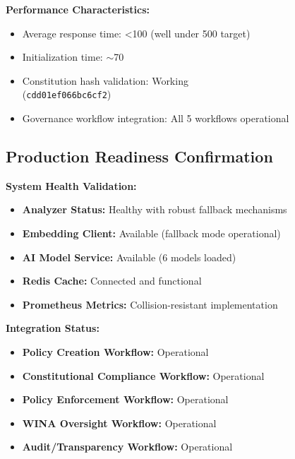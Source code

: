 \textbf{Performance Characteristics:}
\begin{itemize}[leftmargin=*,topsep=2pt,itemsep=2pt,parsep=0pt]
    \item Average response time: <100\ms{} (well under 500\ms{} target)
    \item Initialization time: $\sim$70\ms{}
    \item Constitution hash validation: Working \\
    (\texttt{cdd01ef066bc6cf2})
    \item Governance workflow integration: All 5 workflows operational
\end{itemize}

\subsection{Production Readiness Confirmation}

\textbf{System Health Validation:}
\begin{itemize}[leftmargin=*,topsep=2pt,itemsep=2pt,parsep=0pt]
    \item \checkmarkcustom{} \textbf{Analyzer Status:} Healthy with robust fallback mechanisms
    \item \checkmarkcustom{} \textbf{Embedding Client:} Available (fallback mode operational)
    \item \checkmarkcustom{} \textbf{AI Model Service:} Available (6 models loaded)
    \item \checkmarkcustom{} \textbf{Redis Cache:} Connected and functional
    \item \checkmarkcustom{} \textbf{Prometheus Metrics:} Collision-resistant implementation
\end{itemize}

\textbf{Integration Status:}
\begin{itemize}[leftmargin=*,topsep=2pt,itemsep=2pt,parsep=0pt]
    \item \checkmarkcustom{} \textbf{Policy Creation Workflow:} Operational
    \item \checkmarkcustom{} \textbf{Constitutional Compliance Workflow:} Operational
    \item \checkmarkcustom{} \textbf{Policy Enforcement Workflow:} Operational
    \item \checkmarkcustom{} \textbf{WINA Oversight Workflow:} Operational
    \item \checkmarkcustom{} \textbf{Audit/Transparency Workflow:} Operational
\end{itemize}

